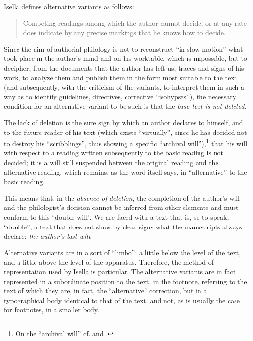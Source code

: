 \documentclass{article}
\begin{document}
Isella defines alternative variants as follows:

\begin{quote}
Competing readings among which the author cannot decide, or at any rate
does indicate by any precise markings that he knows how to
decide.
\begin{flushright}
\parencite[xxxiv]{isella_nota_1983}
\end{flushright}
\end{quote}

\noindent Since the aim of authorial philology is not to reconstruct ``in slow
motion'' what took place in the author's mind and on his worktable, which
is impossible, but to decipher, from the documents that the author has
left us, traces and signs of his work, to analyze them and publish them
in the form most suitable to the text (and subsequently, with the
criticism of the variants, to interpret them in such a way as to
identify guidelines, directives, corrective ``isohypses''), the necessary
condition for an alternative variant to be such is that the \emph{base
text is not deleted}.

The lack of deletion is the sure sign by which an author declares to
himself, and to the future reader of his text (which exists ``virtually'',
since he has decided not to destroy his ``scribblings'', thus showing a
specific ``archival will''),\footnote{On the ``archival will'' cf. \cite{albonico_autore_2015} and \cite{italia_italian_nodate}.} that
his will with respect to a reading written subsequently to the basic
reading is not decided; it is a will still suspended between the
original reading and the alternative reading, which remains, as the word
itself says, in ``alternative'' to the basic reading.

This means that, in the \emph{absence of deletion}, the completion of
the author's will and the philologist's decision cannot be inferred from
other elements and must conform to this ``double will''. We are
faced with a text that is, so to speak, ``double'', a text that does not
show by clear signs what the manuscripts always declare: \emph{the
author's last will}.

Alternative variants are in a sort of ``limbo'': a little below the level
of the text, and a little above the level of the apparatus. Therefore,
the method of representation used by Isella is particular. The
alternative variants are in fact represented in a subordinate position
to the text, in the footnote, referring to the text of which they are,
in fact, the ``alternative'' correction, but in a typographical body
identical to that of the text, and not, as is usually the case for
footnotes, in a smaller body.
\end{document}
